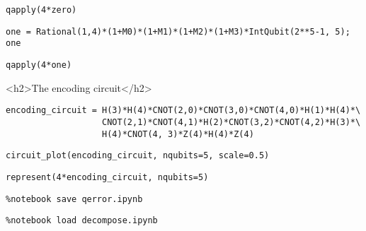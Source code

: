 \begin{verbatim}
qapply(4*zero)

\end{verbatim}

\begin{verbatim}
one = Rational(1,4)*(1+M0)*(1+M1)*(1+M2)*(1+M3)*IntQubit(2**5-1, 5); one

\end{verbatim}

\begin{verbatim}
qapply(4*one)

\end{verbatim}

<h2>The encoding circuit</h2>

\begin{verbatim}
encoding_circuit = H(3)*H(4)*CNOT(2,0)*CNOT(3,0)*CNOT(4,0)*H(1)*H(4)*\
                   CNOT(2,1)*CNOT(4,1)*H(2)*CNOT(3,2)*CNOT(4,2)*H(3)*\
                   H(4)*CNOT(4, 3)*Z(4)*H(4)*Z(4)

\end{verbatim}

\begin{verbatim}
circuit_plot(encoding_circuit, nqubits=5, scale=0.5)
\end{verbatim}

\begin{verbatim}
represent(4*encoding_circuit, nqubits=5)
\end{verbatim}

\begin{verbatim}
%notebook save qerror.ipynb
\end{verbatim}

\begin{verbatim}
%notebook load decompose.ipynb
\end{verbatim}

